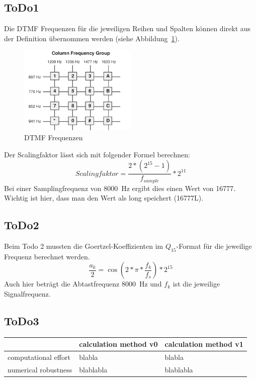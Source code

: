 \documentclass[a4paper,11pt]{article}
\begin{document}
\subsection{ToDo1}
Die DTMF Frequenzen für die jeweiligen Reihen und Spalten können direkt aus der Definition übernommen werden (siehe Abbildung~\ref{fig:DTMF_freq}).
\begin{figure}[h!]
\centering
\includegraphics[width=0.5\textwidth]{DTMF_freq}
\caption{DTMF Frequenzen}
\label{fig:DTMF_freq}
\end{figure}
\newline
Der Scalingfaktor lässt sich mit folgender Formel berechnen:
\begin{equation}\label{eq:Scalingfakt}
	Scalingfaktor = \frac{2*(2^{15}-1)}{f_{sample}}*2^{11}
\end{equation}
Bei einer Samplingfrequenz von \SI{8000}{\hertz} ergibt dies einen Wert von 16777. Wichtig ist hier, dass man den Wert als long speichert (16777L). 

\subsection{ToDo2}
Beim Todo 2 mussten die Goertzel-Koeffizienten im $Q_{15}$-Format für die jeweilige Frequenz berechnet werden.
\begin{equation}\label{eq:Goertzel_Koeff}
	\frac{a_k}{2}= \cos(2*\pi*\frac{f_k}{f_s})*2^{15}
\end{equation}
Auch hier beträgt die Abtastfrequenz \SI{8000}{\hertz} und $f_k$ ist die jeweilige Signalfrequenz.

\subsection{ToDo3}

\begin{tabular}{lll}
\hline
   & calculation method v0 & calculation method v1 \\
\hline
computational effort    & blabla    & blabla  \\
numerical robustness & blablabla  & blablabla  \\
\hline
\end{tabular}
\end{document}
